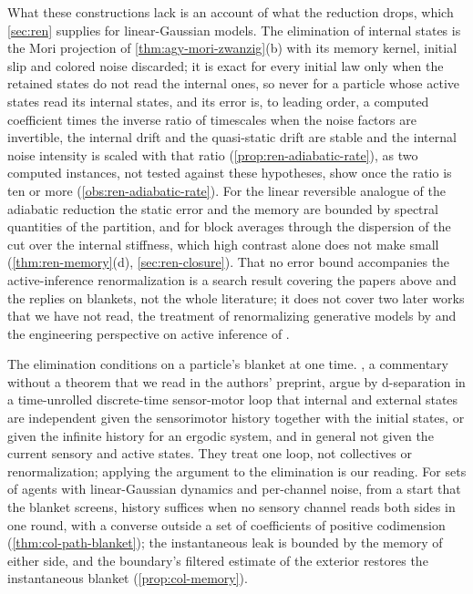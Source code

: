 What these constructions lack is an account of what the reduction drops, which \cref{sec:ren} supplies for linear-Gaussian models. The elimination of internal states is the Mori projection of \cref{thm:agy-mori-zwanzig}(b) with its memory kernel, initial slip and colored noise discarded; it is exact for every initial law only when the retained states do not read the internal ones, so never for a particle whose active states read its internal states, and its error is, to leading order, a computed coefficient times the inverse ratio of timescales when the noise factors are invertible, the internal drift and the quasi-static drift are stable and the internal noise intensity is scaled with that ratio (\cref{prop:ren-adiabatic-rate}), as two computed instances, not tested against these hypotheses, show once the ratio is ten or more (\cref{obs:ren-adiabatic-rate}). For the linear reversible analogue of the adiabatic reduction the static error and the memory are bounded by spectral quantities of the partition, and for block averages through the dispersion of the cut over the internal stiffness, which high contrast alone does not make small (\cref{thm:ren-memory}(d), \cref{sec:ren-closure}). That no error bound accompanies the active-inference renormalization is a search result covering the papers above and the replies on blankets, not the whole literature; it does not cover two later works that we have not read, the treatment of renormalizing generative models by \citet{zaghw2026renormalising} and the engineering perspective on active inference of \citet{devries2026active}.

The elimination conditions on a particle's blanket at one time. \citet{virgo2022embracing}, a commentary without a theorem that we read in the authors' preprint, argue by d-separation in a time-unrolled discrete-time sensor-motor loop that internal and external states are independent given the sensorimotor history together with the initial states, or given the infinite history for an ergodic system, and in general not given the current sensory and active states. They treat one loop, not collectives or renormalization; applying the argument to the elimination is our reading. For sets of agents with linear-Gaussian dynamics and per-channel noise, from a start that the blanket screens, history suffices when no sensory channel reads both sides in one round, with a converse outside a set of coefficients of positive codimension (\cref{thm:col-path-blanket}); the instantaneous leak is bounded by the memory of either side, and the boundary's filtered estimate of the exterior restores the instantaneous blanket (\cref{prop:col-memory}).

